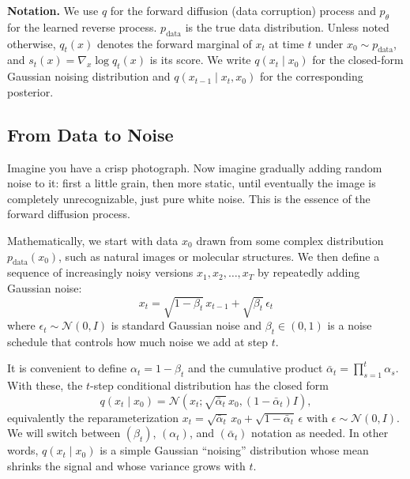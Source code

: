 \vspSmall
\begin{keyinsight}
\textbf{Notation.} We use $q$ for the forward diffusion (data corruption) process and $p_\theta$ for the learned reverse process. $p_{\text{data}}$ is the true data distribution. Unless noted otherwise, $q_t(x)$ denotes the forward marginal of $x_t$ at time $t$ under $x_0\sim p_{\text{data}}$, and $s_t(x)=\nabla_x\log q_t(x)$ is its score. We write $q(x_t\mid x_0)$ for the closed-form Gaussian noising distribution and $q(x_{t-1}\mid x_t,x_0)$ for the corresponding posterior.
\end{keyinsight}

\label{sec:forward_process}

\vspBlock

\subsection{From Data to Noise}

Imagine you have a crisp photograph. Now imagine gradually adding random noise to it: first a little grain, then more static, until eventually the image is completely unrecognizable, just pure white noise. This is the essence of the forward diffusion process.

\vspPara

Mathematically, we start with data $x_0$ drawn from some complex distribution $p_{\text{data}}(x_0)$, such as natural images or molecular structures. We then define a sequence of increasingly noisy versions $x_1, x_2, \ldots, x_T$ by repeatedly adding Gaussian noise:
%
\begin{equation}
x_t = \sqrt{1 - \beta_t} \, x_{t-1} + \sqrt{\beta_t} \, \epsilon_t
\end{equation}
%
where $\epsilon_t \sim \mathcal{N}(0, I)$ is standard Gaussian noise and $\beta_t \in (0,1)$ is a noise schedule that controls how much noise we add at step $t$.

\vspPara

It is convenient to define $\alpha_t = 1-\beta_t$ and the cumulative product $\bar{\alpha}_t = \prod_{s=1}^t \alpha_s$. With these, the $t$-step conditional distribution has the closed form
$$q(x_t\mid x_0)=\mathcal{N}\!\left(x_t;\sqrt{\bar{\alpha}_t}\,x_0, (1-\bar{\alpha}_t)I\right),$$
equivalently the reparameterization $x_t = \sqrt{\bar{\alpha}_t}\,x_0 + \sqrt{1-\bar{\alpha}_t}\,\epsilon$ with $\epsilon\sim\mathcal{N}(0,I)$. We will switch between $(\beta_t)$, $(\alpha_t)$, and $(\bar{\alpha}_t)$ notation as needed.
In other words, $q(x_t\mid x_0)$ is a simple Gaussian ``noising'' distribution whose mean shrinks the signal and whose variance grows with $t$.

